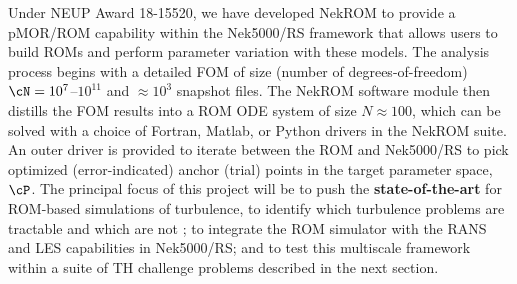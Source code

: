   Under NEUP Award 18-15520, we have developed NekROM to provide a pMOR/ROM
capability within the Nek5000/RS framework that allows users to build ROMs and
perform parameter variation with these models.  The analysis process begins
with a detailed FOM of size (number of degrees-of-freedom)
$\cN=10^7$--$10^{11}$ and $\approx 10^3$ snapshot files.  The NekROM software
module then distills the FOM results into a ROM ODE system of size $N \approx
100$, which can be solved with a choice of Fortran, Matlab, or Python drivers
in the NekROM suite.  An outer driver is provided to iterate between the ROM
and Nek5000/RS to pick optimized (error-indicated) anchor (trial) points in the
target parameter space, $\cP$.
  The principal focus of this project will be to push the \textbf{state-of-the-art} 
for ROM-based simulations of turbulence, to identify which turbulence problems are
tractable and which are not \cite{tsai22a}; to integrate the ROM simulator with
the RANS and LES capabilities in Nek5000/RS; and to test this multiscale 
framework within a suite of TH challenge problems described in the next section.


